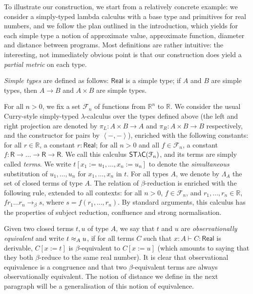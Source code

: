 
To illustrate our construction, we start from a relatively concrete example: we consider a simply-typed lambda calculus with a base type and primitives for real numbers, and we follow the plan outlined in the introduction, which yields for each simple type a notion of approximate value, approximate function, diameter and distance between programs. Most definitions are rather intuitive: the interesting, not immediately obvious point is that our construction does yield a \emph{partial metric} on each type.

\emph{Simple types} are defined as follows: $\mathsf{Real}$ is a simple type; if $A$ and $B$ are simple types, then $A \to B$ and $A \times B$ are simple types.

For all $n>0$, we fix a set $\mathcal{F}_n$ of functions from $\mathbb{R}^n$ to $\mathbb{R}$. We consider the usual Curry-style simply-typed $\lambda$-calculus over the types defined above (the left and right projection are denoted by $\pi_L:A\times B \to A$ and  $\pi_R:A\times B \to B$ respectively, and the constructor for pairs by $\left\langle-,-\right\rangle$), enriched with the following constants: for all $r \in \mathbb{R}$, a constant $r:\mathsf{Real}$; for all $n>0$ and all $f\in\mathcal{F}_n$, a constant $f:\mathsf{R}\to\ldots\to\mathsf{R}\to\mathsf{R}$. We call this calculus $\mathsf{ST\lambda C}(\mathcal F_{n})$, and its terms are simply called \emph{terms}. We write $t[x_1 := u_1, \ldots, x_n := u_n]$ to denote the \emph{simultaneous} substitution of $u_1, \ldots, u_n$ for $x_1, \ldots, x_n$ in $t$. For all types $A$, we denote by $\Lambda_A$ the set of closed terms of type $A$. The relation of $\beta$-reduction is enriched with the following rule, extended to all contexts: for all $n>0$, $f\in\mathcal{F}_n$, and $r_1,\ldots,r_n\in\mathbb{R}$, $f r_1 \ldots r_n \to_\beta s$, where $s = f(r_1, \ldots, r_n)$. By standard arguments, this calculus has the properties of subject reduction, confluence and strong normalisation.


Given two closed terms $t,u$ of type $A$,  we say that $t$ and $u$ are \emph{observationally equivalent} and write $t \approx_A u$, if for all terms $C$ such that $x:A \vdash C : \mathsf{Real}$ is derivable, $C[x:=t]$ is $\beta$-equivalent to $C[x:=u]$ (which amounts to saying that they both $\beta$-reduce to the same real number).  It is clear that observational equivalence is a congruence and that two $\beta$-equivalent terms are always observationally equivalent. The notion of distance we define in the next paragraph will be a generalisation of this notion of equivalence.



